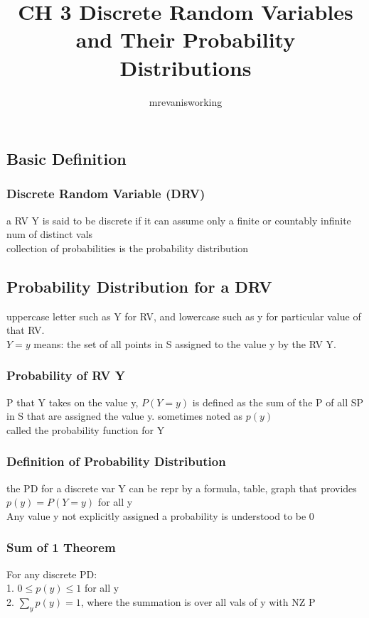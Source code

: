 \documentclass[12pt]{article}
\begin{document}
\title{CH 3 Discrete Random Variables and Their Probability Distributions}
\author{mrevanisworking}
\maketitle

\subsection{Basic Definition}
    \subsubsection{Discrete Random Variable (DRV)}
        a RV Y is said to be discrete if it can assume only a 
        finite or countably infinite num of distinct vals\\
        collection of probabilities is the probability distribution
\subsection{Probability Distribution for a DRV}
    uppercase letter such as Y for RV, and lowercase such as y
    for particular value of that RV.\\
    $ Y = y $ means: the set of all points in S assigned to the
    value y by the RV Y.
    \subsubsection{Probability of RV Y}
        P that Y takes on the value y, $ P(Y = y) $ is defined as the sum
        of the P of all SP in S that are assigned the value y.
        sometimes noted as $ p(y) $\\
        called the probability function for Y
    \subsubsection{Definition of Probability Distribution}
        the PD for a discrete var Y can be repr by a formula, table, graph
        that provides $ p(y) = P(Y = y) $ for all y\\
        Any value y not explicitly assigned a probability is understood
        to be 0
    \subsubsection{Sum of 1 Theorem}
        For any discrete PD:\\
        1. $ 0 \le p(y) \le 1 $ for all y\\
        2. $ \sum_{y}p(y) = 1 $, where the summation is over all vals of y
        with NZ P
\end{document}
